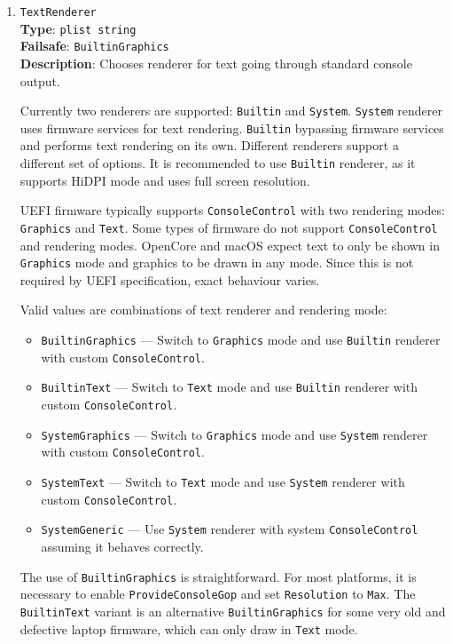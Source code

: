 \documentclass[]{article}
\providecommand{\tightlist}{%
  \setlength{\itemsep}{0pt}\setlength{\parskip}{0pt}}
\begin{document}
\begin{enumerate}

\item
  \texttt{TextRenderer}\\
  \textbf{Type}: \texttt{plist\ string}\\
  \textbf{Failsafe}: \texttt{BuiltinGraphics}\\
  \textbf{Description}: Chooses renderer for text going through standard
  console output.

  Currently two renderers are supported: \texttt{Builtin} and
  \texttt{System}. \texttt{System} renderer uses firmware services
  for text rendering. \texttt{Builtin} bypassing firmware services
  and performs text rendering on its own. Different renderers support
  a different set of options. It is recommended to use \texttt{Builtin}
  renderer, as it supports HiDPI mode and uses full screen resolution.

  UEFI firmware typically supports \texttt{ConsoleControl} with two
  rendering modes: \texttt{Graphics} and \texttt{Text}. Some types of firmware
  do not support \texttt{ConsoleControl} and rendering modes. OpenCore
  and macOS expect text to only be shown in \texttt{Graphics} mode and
  graphics to be drawn in any mode. Since this is not required by UEFI
  specification, exact behaviour varies.

  Valid values are combinations of text renderer and rendering mode:

  \begin{itemize}
  \tightlist
  \item \texttt{BuiltinGraphics} --- Switch to \texttt{Graphics}
    mode and use \texttt{Builtin} renderer with
    custom \texttt{ConsoleControl}.
  \item \texttt{BuiltinText} --- Switch to \texttt{Text}
    mode and use \texttt{Builtin} renderer with
    custom \texttt{ConsoleControl}.
  \item \texttt{SystemGraphics} --- Switch to \texttt{Graphics}
    mode and use \texttt{System} renderer with
    custom \texttt{ConsoleControl}.
  \item \texttt{SystemText} --- Switch to \texttt{Text}
    mode and use \texttt{System} renderer with
    custom \texttt{ConsoleControl}.
  \item \texttt{SystemGeneric} --- Use \texttt{System} renderer with
    system \texttt{ConsoleControl} assuming it behaves correctly.
  \end{itemize}

  The use of \texttt{BuiltinGraphics} is straightforward.
  For most platforms, it is necessary to enable \texttt{ProvideConsoleGop}
  and set \texttt{Resolution} to \texttt{Max}. The \texttt{BuiltinText} variant is
  an alternative \texttt{BuiltinGraphics} for some very old and defective
  laptop firmware, which can only draw in \texttt{Text} mode.


\end{enumerate}
\end{document}

